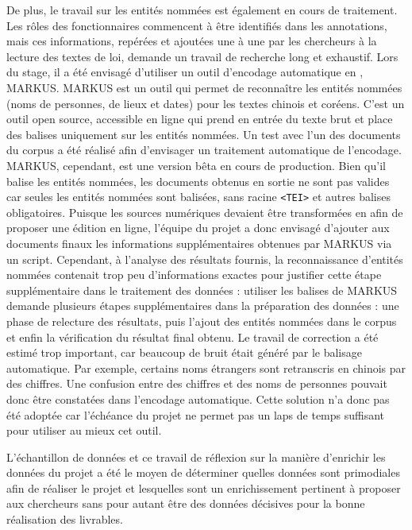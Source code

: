 De plus, le travail sur les entités nommées est également en cours de traitement. Les rôles des fonctionnaires commencent à être identifiés dans les annotations, mais ces informations, repérées et ajoutées une à une par les chercheurs à la lecture des textes de loi, demande un travail de recherche long et exhaustif. Lors du stage, il a été envisagé d'utiliser un outil d'encodage automatique en \TEI, MARKUS. MARKUS est un outil qui permet de reconnaître les entités nommées (noms de personnes, de lieux et dates) pour les textes chinois et coréens. C'est un outil open source, accessible en ligne qui prend en entrée du texte brut et place des balises \TEI uniquement sur les entités nommées. Un test avec l'un des documents du corpus a été réalisé afin d'envisager un traitement automatique de l'encodage. MARKUS, cependant, est une version bêta en cours de production. Bien qu'il balise les entités nommées, les documents \TEI obtenus en sortie ne sont pas valides car seules les entités nommées sont balisées, sans racine \texttt{<TEI>} et autres balises obligatoires. Puisque les sources numériques devaient être transformées en \TEI afin de proposer une édition en ligne, l'équipe du projet a donc envisagé d'ajouter aux documents \TEI finaux les informations supplémentaires obtenues par MARKUS via un script. Cependant, à l'analyse des résultats fournis, la reconnaissance d'entités nommées contenait trop peu d'informations exactes pour justifier cette étape supplémentaire dans le traitement des données : utiliser les balises de MARKUS demande plusieurs étapes supplémentaires dans la préparation des données : une phase de relecture des résultats, puis l'ajout des entités nommées dans le corpus \TEI et enfin la vérification du résultat final obtenu. Le travail de correction a été estimé trop important, car beaucoup de bruit était généré par le balisage automatique. Par exemple, certains noms étrangers sont retranscris en chinois par des chiffres. Une confusion entre des chiffres et des noms de personnes pouvait donc être constatées dans l'encodage automatique. Cette solution n'a donc pas été adoptée car l'échéance du projet ne permet pas un laps de temps suffisant pour utiliser au mieux cet outil. 

L'échantillon de données et ce travail de réflexion sur la manière d'enrichir les données du projet a été le moyen de déterminer quelles données sont primodiales afin de réaliser le projet et lesquelles sont un enrichissement pertinent à proposer aux chercheurs sans pour autant être des données décisives pour la bonne réalisation des livrables.
